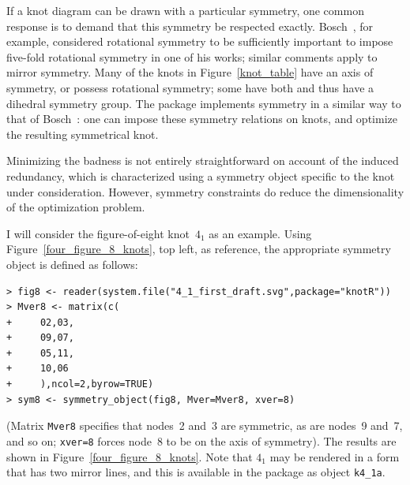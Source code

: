 \documentclass{birkjour}
\theoremstyle{definition}
\theoremstyle{remark}
\numberwithin{equation}{section}
\begin{document}
If a knot diagram can be drawn with a particular symmetry, one common
response is to demand that this symmetry be respected exactly.
Bosch~\cite{bosch2010}, for example, considered rotational symmetry to
be sufficiently important to impose five-fold rotational symmetry in
one of his works; similar comments apply to mirror symmetry.  Many of
the knots in Figure~\ref{knot_table} have an axis of symmetry, or
possess rotational symmetry; some have both and thus have a dihedral
symmetry group.  The package implements symmetry in a similar way to
that of Bosch~\cite{bosch2010}: one can impose these symmetry
relations on knots, and optimize the resulting symmetrical knot.





Minimizing the badness is not entirely straightforward on account of
the induced redundancy, which is characterized using a symmetry object
specific to the knot under consideration.  However, symmetry
constraints do reduce the dimensionality of the optimization problem.

I will consider the figure-of-eight knot~$4_1$ as an example.  Using
Figure~\ref{four_figure_8_knots}, top left, as reference, the
appropriate symmetry object is defined as follows:

\begin{verbatim}
> fig8 <- reader(system.file("4_1_first_draft.svg",package="knotR"))
> Mver8 <- matrix(c(
+     02,03,
+     09,07,
+     05,11,
+     10,06
+     ),ncol=2,byrow=TRUE)
> sym8 <- symmetry_object(fig8, Mver=Mver8, xver=8)
\end{verbatim}

(Matrix {\tt Mver8} specifies that nodes~2 and~3 are symmetric, as are
nodes~9 and~7, and so on; {\tt xver=8} forces node~8 to be on the axis
of symmetry).  The results are shown in
Figure~\ref{four_figure_8_knots}.  Note that $4_1$ may be rendered in
a form that has two mirror lines, and this is available in the package
as object {\tt k4\_1a}.
\end{document}
